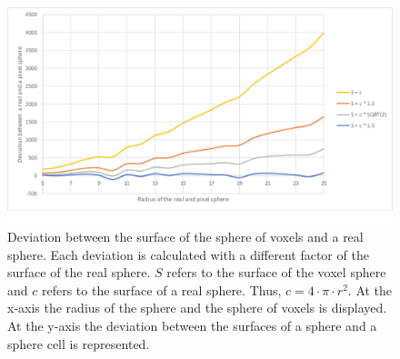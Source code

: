 \begin{figure}[!]
	\center
	\includegraphics[scale=0.3]{figures/DeviationSphereToPixelSphere.png}
	\caption[Deviation between the surface of the sphere of voxels and a real sphere]{Deviation between the surface of the sphere of voxels and a real sphere. Each deviation is calculated with a different factor of the surface of the real sphere. $S$ refers to the surface of the voxel sphere and $c$ refers to the surface of a real sphere. Thus, $c = 4 \cdot \pi \cdot r^{2}$. \newline
	At the x-axis the radius of the sphere and the sphere of voxels is displayed. At the y-axis the deviation between the surfaces of a sphere and a sphere cell is represented.}
	\label{img:DeviationSphere}
\end{figure}


